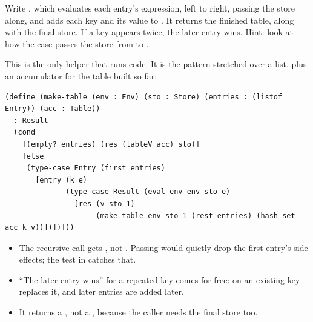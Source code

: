 \begin{exercise}
Write , which evaluates each entry's expression, left to right, passing the store along, and adds each key and its value to . It returns the finished table, along with the final store. If a key appears twice, the later entry wins. Hint: look at how the  case passes the store from  to .
\end{exercise}
\begin{solution}
This is the only helper that runs code. It is the  pattern stretched over a list, plus an accumulator for the table built so far:
\begin{lstlisting}
(define (make-table (env : Env) (sto : Store) (entries : (listof Entry)) (acc : Table))
  : Result
  (cond
    [(empty? entries) (res (tableV acc) sto)]
    [else
     (type-case Entry (first entries)
       [entry (k e)
              (type-case Result (eval-env env sto e)
                [res (v sto-1)
                     (make-table env sto-1 (rest entries) (hash-set acc k v))])])]))
\end{lstlisting}
\begin{itemize}
  \item The recursive call gets , not . Passing  would quietly drop the first entry's side effects; the  test in  catches that.
  \item ``The later entry wins'' for a repeated key comes for free:  on an existing key replaces it, and later entries are added later.
  \item It returns a , not a , because the caller needs the final store too.
\end{itemize}
\end{solution}

